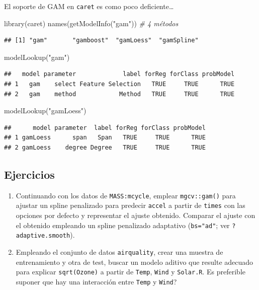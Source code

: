 \documentclass[
  spanish,
]{book}
\newenvironment{Shaded}{\begin{snugshade}}{\end{snugshade}}
\newcommand{\CommentTok}[1]{\textcolor[rgb]{0.56,0.35,0.01}{\textit{#1}}}
\newcommand{\FunctionTok}[1]{\textcolor[rgb]{0.00,0.00,0.00}{#1}}
\newcommand{\NormalTok}[1]{#1}
\newcommand{\StringTok}[1]{\textcolor[rgb]{0.31,0.60,0.02}{#1}}
\theoremstyle{break}
\theoremstyle{definition}
\theoremstyle{definition}
\theoremstyle{definition}
\theoremstyle{definition}
\theoremstyle{remark}
\begin{document}
El soporte de GAM en \texttt{caret} es como poco deficiente\ldots{}

\begin{Shaded}
\begin{Highlighting}[]
\FunctionTok{library}\NormalTok{(caret)}
\FunctionTok{names}\NormalTok{(}\FunctionTok{getModelInfo}\NormalTok{(}\StringTok{"gam"}\NormalTok{)) }\CommentTok{\# 4 métodos}
\end{Highlighting}
\end{Shaded}

\begin{verbatim}
## [1] "gam"       "gamboost"  "gamLoess"  "gamSpline"
\end{verbatim}

\begin{Shaded}
\begin{Highlighting}[]
\FunctionTok{modelLookup}\NormalTok{(}\StringTok{"gam"}\NormalTok{)}
\end{Highlighting}
\end{Shaded}

\begin{verbatim}
##   model parameter             label forReg forClass probModel
## 1   gam    select Feature Selection   TRUE     TRUE      TRUE
## 2   gam    method            Method   TRUE     TRUE      TRUE
\end{verbatim}

\begin{Shaded}
\begin{Highlighting}[]
\FunctionTok{modelLookup}\NormalTok{(}\StringTok{"gamLoess"}\NormalTok{)}
\end{Highlighting}
\end{Shaded}

\begin{verbatim}
##      model parameter  label forReg forClass probModel
## 1 gamLoess      span   Span   TRUE     TRUE      TRUE
## 2 gamLoess    degree Degree   TRUE     TRUE      TRUE
\end{verbatim}

\hypertarget{ejercicios}{%
\subsection{Ejercicios}\label{ejercicios}}

\begin{enumerate}
\def\labelenumi{\arabic{enumi}.}
\item
  Continuando con los datos de \texttt{MASS:mcycle}, emplear \texttt{mgcv::gam()} para ajustar un spline penalizado para predecir \texttt{accel} a partir de \texttt{times} con las opciones por defecto y representar el ajuste obtenido. Comparar el ajuste con el obtenido empleando un spline penalizado adaptativo (\texttt{bs="ad"}; ver \texttt{?adaptive.smooth}).
\item
  Empleando el conjunto de datos \texttt{airquality}, crear una muestra de entrenamiento y otra de test, buscar un modelo aditivo que resulte adecuado para explicar \texttt{sqrt(Ozone)} a partir de \texttt{Temp}, \texttt{Wind} y \texttt{Solar.R}.
  Es preferible suponer que hay una interacción entre \texttt{Temp} y \texttt{Wind}?
\end{enumerate}
\end{document}
